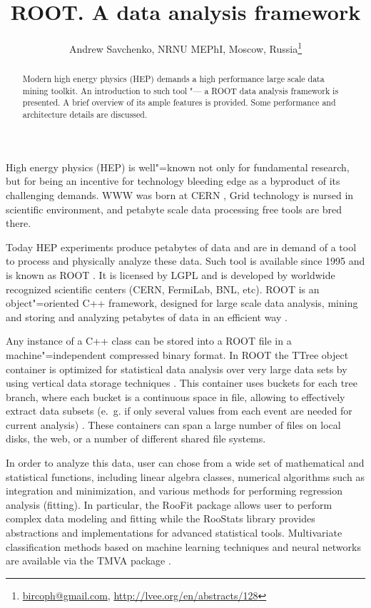 \documentclass[10pt, a5paper]{article}
\begin{document}
\title{ROOT. A data analysis framework}
\author{Andrew Savchenko, NRNU MEPhI, Moscow, Russia\footnote{\url{bircoph@gmail.com}, \url{http://lvee.org/en/abstracts/128}}}
\maketitle
\begin{abstract}
Modern high energy physics (HEP) demands a high perfor\-mance large scale data mining toolkit. An introduction to such tool "--- a ROOT data analysis framework is presented. A brief overview of its ample features is provided. Some performance and architecture details are discussed.
\end{abstract}
High energy physics (HEP) is well"=known not only for fundamental research, but for being an incentive for technology bleeding edge as a byproduct of its challenging demands. WWW was born at CERN \cite{Savchenko1}, Grid technology is nursed in scientific environment, and petabyte scale data processing free tools are bred there.

Today HEP experiments produce petabytes of data and are in de\-mand of a tool to process and physically analyze these data. Such tool is available since 1995 and is known as ROOT \cite{Savchenko2}. It is licensed by LGPL and is developed by worldwide recognized scientific centers (CERN, FermiLab, BNL, etc). ROOT is an object"=oriented C++ framework, designed for large scale data analysis, mining and storing and analyzing petabytes of data in an efficient way \cite{Savchenko3}.

Any instance of a C++ class can be stored into a ROOT file in a machine"=independent compressed binary format. In ROOT the TTree object container is optimized for statistical data analysis over very large data sets by using vertical data storage techniques \cite{Savchenko4}. This container uses buckets for each tree branch, where each bucket is a continuous space in file, allowing to effectively extract data subsets (e.~g. if only several values from each event are needed for current analysis) \cite{Savchenko5}. These containers can span a large number of files on local disks, the web, or a number of different shared file systems.

In order to analyze this data, user can chose from a wide set of mathematical and statistical functions, including linear algebra classes, numerical algorithms such as integration and minimization, and various methods for performing regression analysis (fitting). In particular, the RooFit package \cite{Savchenko6} allows user to perform complex data modeling and fitting while the RooStats library provides abstractions and implementations for advanced statistical tools. Multivariate classification methods based on machine learning techniques and neural networks are available via the TMVA package \cite{Savchenko7}.
\end{document}
